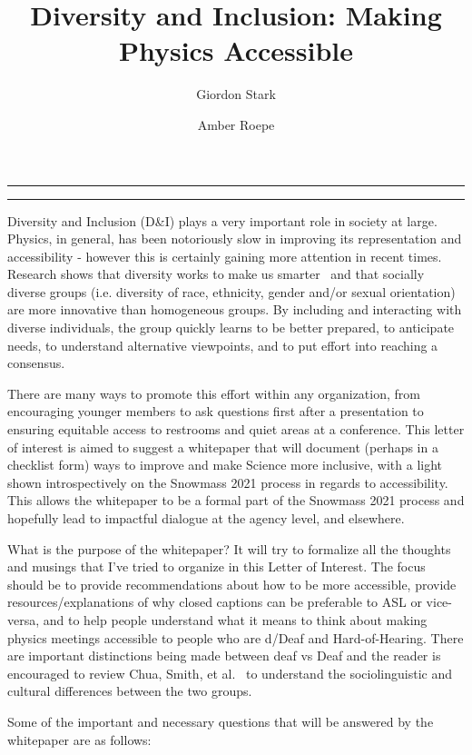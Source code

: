 \documentclass{article}
\title{Diversity and Inclusion: Making Physics Accessible}
\author[a]{Giordon Stark}
\author[b]{Amber Roepe}
\affil[a]{SCIPP, UC Santa Cruz}
\affil[b]{University of Oklahoma}
\date{}
\begin{document}
\maketitle
\hrule
\vspace{0.5em}
\hrule
\vspace{2.5em}

  Diversity and Inclusion (D\&I) plays a very important role in society at large. Physics, in general, has been notoriously slow in improving its representation and accessibility - however this is certainly gaining more attention in recent times. Research shows that diversity works to make us smarter~\cite{HowDiversityWorks} and that socially diverse groups (i.e. diversity of race, ethnicity, gender and/or sexual orientation) are more innovative than homogeneous groups. By including and interacting with diverse individuals, the group quickly learns to be better prepared, to anticipate needs, to understand alternative viewpoints, and to put effort into reaching a consensus.

  There are many ways to promote this effort within any organization, from encouraging younger members to ask questions first after a presentation to ensuring equitable access to restrooms and quiet areas at a conference. This letter of interest is aimed to suggest a whitepaper that will document (perhaps in a checklist form) ways to improve and make Science more inclusive, with a light shown introspectively on the Snowmass 2021 process in regards to accessibility. This allows the whitepaper to be a formal part of the Snowmass 2021 process and hopefully lead to impactful dialogue at the agency level, and elsewhere.

  What is the purpose of the whitepaper? It will try to formalize all the thoughts and musings that I've tried to organize in this Letter of Interest. The focus should be to provide recommendations about how to be more accessible, provide resources/explanations of why closed captions can be preferable to ASL or vice-versa, and to help people understand what it means to think about making physics meetings accessible to people who are d/Deaf and Hard-of-Hearing. There are important distinctions being made between deaf vs Deaf and the reader is encouraged to review Chua, Smith, et al.~\cite{asee_peer_32676} to understand the sociolinguistic and cultural differences between the two groups.

  Some of the important and necessary questions that will be answered by the whitepaper are as follows:
\end{document}
